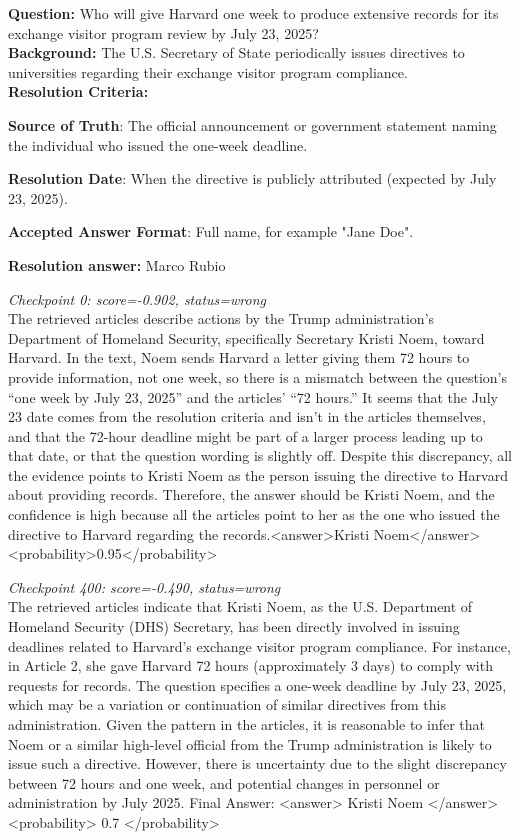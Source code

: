 \noindent\textbf{Question:} Who will give Harvard one week to produce extensive records for its exchange visitor program review by July 23, 2025? \\
\noindent\textbf{Background:} The U.S. Secretary of State periodically issues directives to universities regarding their exchange visitor program compliance.\\
\noindent\textbf{Resolution Criteria:}

\textbf{Source of Truth}: The official announcement or government statement naming the individual who issued the one-week deadline.

\textbf{Resolution Date}: When the directive is publicly attributed (expected by July 23, 2025).

\textbf{Accepted Answer Format}: Full name, for example "Jane Doe".

\noindent\textbf{Resolution answer:} Marco Rubio

\medskip

\noindent\textit{Checkpoint 0: score=-0.902, status=wrong}\\
The retrieved articles describe actions by the Trump administration's Department of Homeland Security, specifically Secretary Kristi Noem, toward Harvard. In the text, Noem sends Harvard a letter giving them 72 hours to provide information, not one week, so there is a mismatch between the question's ``one week by July 23, 2025'' and the articles' ``72 hours.'' It seems that the July 23 date comes from the resolution criteria and isn't in the articles themselves, and that the 72-hour deadline might be part of a larger process leading up to that date, or that the question wording is slightly off. Despite this discrepancy, all the evidence points to Kristi Noem as the person issuing the directive to Harvard about providing records. Therefore, the answer should be Kristi Noem, and the confidence is high because all the articles point to her as the one who issued the directive to Harvard regarding the records.<answer>Kristi Noem</answer> <probability>0.95</probability>

\medskip

\noindent\textit{Checkpoint 400: score=-0.490, status=wrong}\\
The retrieved articles indicate that Kristi Noem, as the U.S. Department of Homeland Security (DHS) Secretary, has been directly involved in issuing deadlines related to Harvard's exchange visitor program compliance. For instance, in Article 2, she gave Harvard 72 hours (approximately 3 days) to comply with requests for records. The question specifies a one-week deadline by July 23, 2025, which may be a variation or continuation of similar directives from this administration. Given the pattern in the articles, it is reasonable to infer that Noem or a similar high-level official from the Trump administration is likely to issue such a directive. However, there is uncertainty due to the slight discrepancy between 72 hours and one week, and potential changes in personnel or administration by July 2025. Final Answer: <answer> Kristi Noem </answer> <probability> 0.7 </probability>

